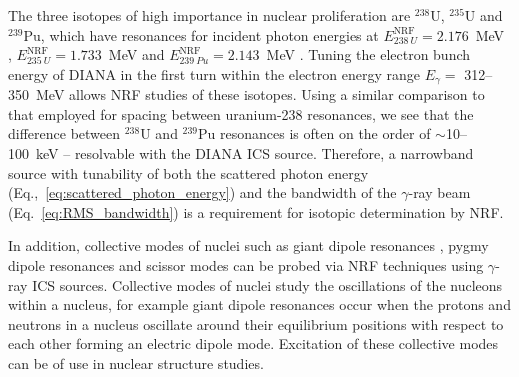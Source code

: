 \documentclass[../main.tex]{subfiles}
\begin{document}
The three isotopes of high importance in nuclear proliferation are $^{238}\mathrm{U}$, $^{235}\mathrm{U}$ and $^{239}\mathrm{Pu}$, which have resonances for incident photon energies at $E_{238~U}^{\mathrm{NRF}} = 2.176$~\si{\mega\electronvolt} \cite{quiter2011transmission},  $E_{235~U}^{\mathrm{NRF}} = 1.733$~\si{\mega\electronvolt} and  $E_{239~Pu}^{\mathrm{NRF}} = 2.143$~\si{\mega\electronvolt} \cite{hayakawa2010nondestructive}. Tuning the electron bunch energy of DIANA in the first turn within the electron energy range $E_{\gamma} =$ 312--350~\si{\mega\electronvolt} allows NRF studies of these isotopes. Using a similar comparison to that employed for spacing between uranium-238 resonances, we see that the difference between $^{238}\mathrm{U}$ \cite{quiter2011transmission} and $^{239}\mathrm{Pu}$ \cite{hayakawa2010nondestructive} resonances is often on the order of $\sim$10--100~\si{\kilo\electronvolt} -- resolvable with the DIANA ICS source. Therefore, a narrowband source with tunability of both the scattered photon energy (Eq.,~\ref{eq:scattered_photon_energy}) and the bandwidth of the $\gamma$-ray beam (Eq.~\ref{eq:RMS_bandwidth}) is a requirement for isotopic determination by NRF.

In addition, collective modes of nuclei such as giant dipole resonances \cite{goldhaber1948nuclear,baldwin1947photo}, pygmy dipole resonances \cite{cook1957photodisintegration,tonchev2010spectral} and scissor modes \cite{iudice1978new,de1984reformulation,bohle1984new} can be probed via NRF techniques using $\gamma$-ray ICS sources. Collective modes of nuclei study the oscillations of the nucleons within a nucleus, for example giant dipole resonances occur when the protons and neutrons in a nucleus oscillate around their equilibrium positions with respect to each other forming an electric dipole mode. Excitation of these collective modes can be of use in nuclear structure studies.
\end{document}
